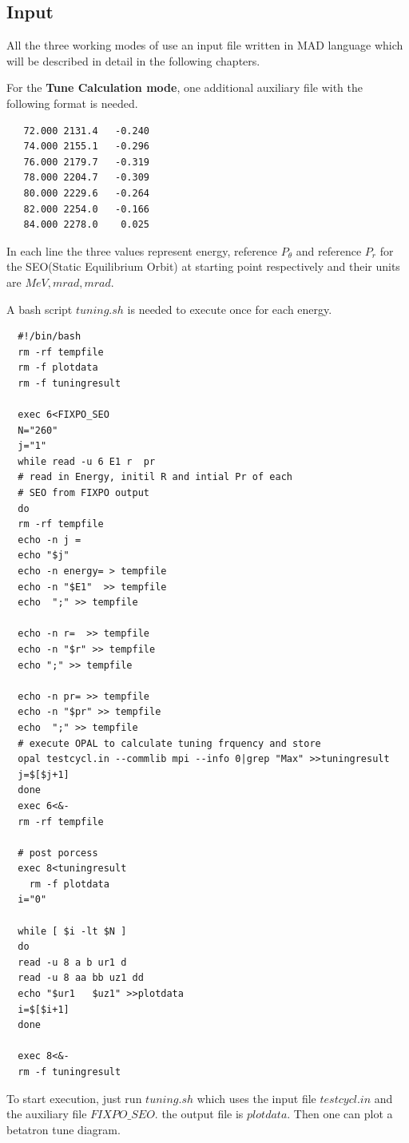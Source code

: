 \subsection{Input}  
All the three working modes of \opalcycl use an input file written in MAD language which will be described in detail in the following chapters.

For the  {\bfseries Tune Calculation mode}, one additional auxiliary file with the following format is needed.
\begin{verbatim}
   72.000 2131.4   -0.240  
   74.000 2155.1   -0.296  
   76.000 2179.7   -0.319 
   78.000 2204.7   -0.309 
   80.000 2229.6   -0.264 
   82.000 2254.0   -0.166 
   84.000 2278.0    0.025 
\end{verbatim}
In each line the three values represent energy, reference $P_\theta$ and reference $P_r$ for the SEO(Static Equilibrium Orbit) 
at starting point respectively and their units are $MeV,  mrad,  mrad$.

A bash script $tuning.sh$ is needed to execute \opalcycl once for each energy. 
{ \footnotesize
\begin{verbatim}
  #!/bin/bash
  rm -rf tempfile
  rm -f plotdata
  rm -f tuningresult

  exec 6<FIXPO_SEO
  N="260"
  j="1"
  while read -u 6 E1 r  pr
  # read in Energy, initil R and intial Pr of each 
  # SEO from FIXPO output
  do
  rm -rf tempfile
  echo -n j =
  echo "$j"
  echo -n energy= > tempfile
  echo -n "$E1"  >> tempfile
  echo  ";" >> tempfile

  echo -n r=  >> tempfile
  echo -n "$r" >> tempfile
  echo ";" >> tempfile

  echo -n pr= >> tempfile
  echo -n "$pr" >> tempfile
  echo  ";" >> tempfile
  # execute OPAL to calculate tuning frquency and store
  opal testcycl.in --commlib mpi --info 0|grep "Max" >>tuningresult
  j=$[$j+1]
  done
  exec 6<&-
  rm -rf tempfile

  # post porcess
  exec 8<tuningresult
    rm -f plotdata
  i="0"

  while [ $i -lt $N ]
  do
  read -u 8 a b ur1 d
  read -u 8 aa bb uz1 dd
  echo "$ur1   $uz1" >>plotdata
  i=$[$i+1]
  done

  exec 8<&-
  rm -f tuningresult
\end{verbatim}
}
To start execution, just run $tuning.sh$ which uses the input file $testcycl.in$ and the auxiliary file {\footnotesize$FIXPO\_SEO$}.
the output file is $plotdata$. Then one can plot a betatron tune diagram.


